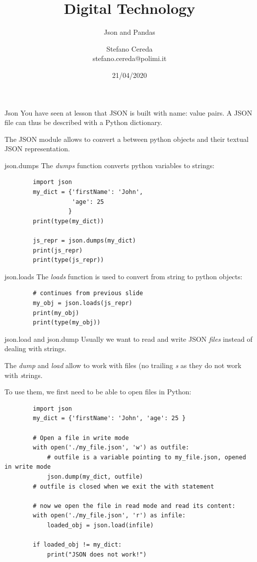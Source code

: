 \documentclass[aspectratio=169,]{beamer}
\title{Digital Technology}
\subtitle{Json and Pandas}
\author{Stefano Cereda\\
stefano.cereda@polimi.it
}
\date{21/04/2020}
\institute[PoliMi]{Politecnico Milano}
\begin{document}
\begin{frame}
    \maketitle
\end{frame}

\begin{frame}{Json}
    You have seen at lesson that JSON is built with name: value pairs.
    A JSON file can thus be described with a Python dictionary.

    The JSON module allows to convert a between python objects and their textual JSON representation.
\end{frame}

\begin{frame}[fragile]{json.dumps}
    The \emph{dumps} function converts python variables to strings:
    \begin{verbatim}
        import json
        my_dict = {'firstName': 'John',
                   'age': 25
                  }
        print(type(my_dict))

        js_repr = json.dumps(my_dict)
        print(js_repr)
        print(type(js_repr))
    \end{verbatim}
\end{frame}

\begin{frame}[fragile]{json.loads}
    The \emph{loads} function is used to convert from string to python objects:
    \begin{verbatim}
        # continues from previous slide
        my_obj = json.loads(js_repr)
        print(my_obj)
        print(type(my_obj))
    \end{verbatim}
\end{frame}


\begin{frame}[fragile]{json.load and json.dump}
    Usually we want to read and write JSON \emph{files} instead of dealing with strings.

    The \emph{dump} and \emph{load} allow to work with files (no trailing \emph{s} as they do not work with
    \emph{s}trings.

    To use them, we first need to be able to open files in Python:
    \begin{verbatim}
        import json
        my_dict = {'firstName': 'John', 'age': 25 }

        # Open a file in write mode
        with open('./my_file.json', 'w') as outfile:
            # outfile is a variable pointing to my_file.json, opened in write mode
            json.dump(my_dict, outfile)
        # outfile is closed when we exit the with statement

        # now we open the file in read mode and read its content:
        with open('./my_file.json', 'r') as infile:
            loaded_obj = json.load(infile)

        if loaded_obj != my_dict:
            print("JSON does not work!")
    \end{verbatim}
\end{frame}
\end{document}
